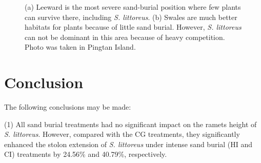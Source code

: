 \documentclass[]{interact}
\theoremstyle{plain}%
\theoremstyle{definition}
\theoremstyle{remark}
\begin{document}
\begin{figure}
  \centering
  \hspace{5pt}
  \caption{(a) Leeward is the most severe sand-burial position where few plants can survive there, including \textit{S. littoreus}. (b) Swales are much better habitats for plants because of little sand burial. However, \textit{S. littoreus} can not be dominant in this area because of heavy competition. Photo was taken in Pingtan Island.} 
  \label{fig:leeward_swale}
\end{figure}

\section{Conclusion}
The following conclusions may be made:

(1) All sand burial treatments had no significant impact on the 
ramets height of \textit{S. littoreus}. However, compared with the CG treatments, they significantly enhanced the stolon extension of \textit{S. littoreus} under intense sand burial (HI and CI) treatments by 24.56\% and 40.79\%, respectively.
\end{document}
